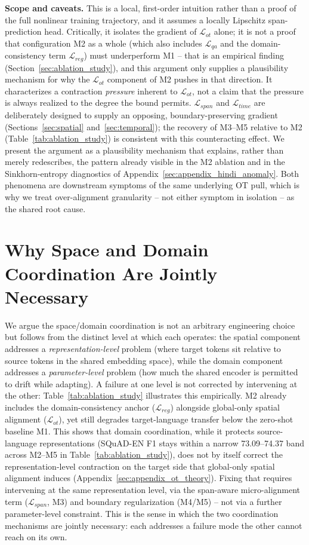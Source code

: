 \documentclass[11pt]{article}
\begin{document}
\textbf{Scope and caveats.} This is a local, first-order intuition rather than a proof of the full nonlinear training trajectory, and it assumes a locally Lipschitz span-prediction head. Critically, it isolates the gradient of $\mathcal{L}_{ot}$ alone; it is not a proof that configuration M2 as a whole (which also includes $\mathcal{L}_{qa}$ and the domain-consistency term $\mathcal{L}_{reg}$) must underperform M1 -- that is an empirical finding (Section~\ref{sec:ablation_study}), and this argument only supplies a plausibility mechanism for why the $\mathcal{L}_{ot}$ component of M2 pushes in that direction. It characterizes a contraction \emph{pressure} inherent to $\mathcal{L}_{ot}$, not a claim that the pressure is always realized to the degree the bound permits. $\mathcal{L}_{span}$ and $\mathcal{L}_{time}$ are deliberately designed to supply an opposing, boundary-preserving gradient (Sections~\ref{sec:spatial} and~\ref{sec:temporal}); the recovery of M3--M5 relative to M2 (Table~\ref{tab:ablation_study}) is consistent with this counteracting effect. We present the argument as a plausibility mechanism that explains, rather than merely redescribes, the pattern already visible in the M2 ablation and in the Sinkhorn-entropy diagnostics of Appendix~\ref{sec:appendix_hindi_anomaly}. Both phenomena are downstream symptoms of the same underlying OT pull, which is why we treat over-alignment granularity -- not either symptom in isolation -- as the shared root cause.

\section{Why Space and Domain Coordination Are Jointly Necessary}
\label{sec:appendix_three_axes}
We argue the space/domain coordination is not an arbitrary engineering choice but follows from the distinct level at which each operates: the spatial component addresses a \emph{representation-level} problem (where target tokens sit relative to source tokens in the shared embedding space), while the domain component addresses a \emph{parameter-level} problem (how much the shared encoder is permitted to drift while adapting). A failure at one level is not corrected by intervening at the other: Table~\ref{tab:ablation_study} illustrates this empirically. M2 already includes the domain-consistency anchor ($\mathcal{L}_{reg}$) alongside global-only spatial alignment ($\mathcal{L}_{ot}$), yet still degrades target-language transfer below the zero-shot baseline M1. This shows that domain coordination, while it protects source-language representations (SQuAD-EN F1 stays within a narrow 73.09--74.37 band across M2--M5 in Table~\ref{tab:ablation_study}), does not by itself correct the representation-level contraction on the target side that global-only spatial alignment induces (Appendix~\ref{sec:appendix_ot_theory}). Fixing that requires intervening at the same representation level, via the span-aware micro-alignment term ($\mathcal{L}_{span}$, M3) and boundary regularization (M4/M5) -- not via a further parameter-level constraint. This is the sense in which the two coordination mechanisms are jointly necessary: each addresses a failure mode the other cannot reach on its own.
\end{document}
